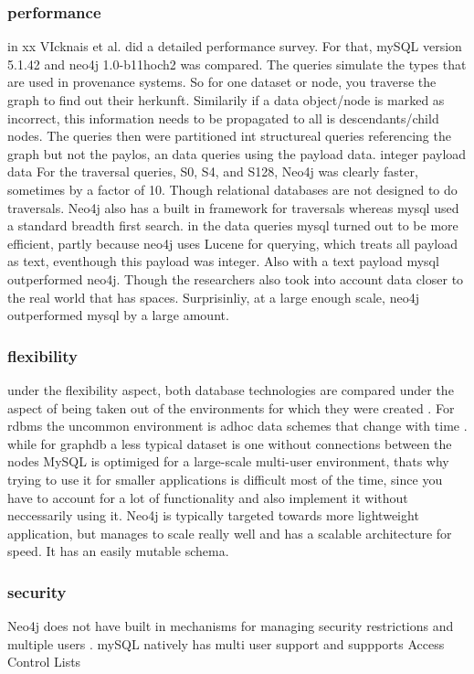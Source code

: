 \subsubsection{performance}
in xx VIcknais et al. did a detailed performance survey. For that, mySQL version 5.1.42 and neo4j 1.0-b11hoch2 was compared. \cite{Vicknair2010}
The queries simulate the types that are used in provenance systems. So for one dataset or node, you traverse the graph to find out their herkunft. Similarily if a data object/node is marked as incorrect, this information needs to be propagated to all is descendants/child nodes.
The queries then were partitioned int structureal queries referencing the graph but not the paylos, an data queries using the payload data. integer payload data
For the traversal queries, S0, S4, and S128, Neo4j was clearly faster, sometimes by a factor of 10. Though relational databases are not designed to do traversals. Neo4j also has a built in framework for traversals whereas mysql used a standard breadth first search.
in the data queries mysql turned out to be more efficient, partly because neo4j uses Lucene for querying, which treats all payload as text, eventhough this payload was integer. Also with a text payload mysql outperformed neo4j. Though the  researchers also took into account data closer to the real world that has spaces. Surprisinliy, at a large enough scale, neo4j outperformed mysql by a large amount.

\subsubsection{flexibility}
under the flexibility aspect, both database technologies are compared under the aspect of being taken out of the environments for which they were created \citep{Vicknair2010}. For rdbms the uncommon environment is adhoc data schemes that change with time \cite{GarimaAnalysis}. while for graphdb a less typical dataset is one without connections between the nodes
MySQL is optimiged for a large-scale multi-user environment, thats why trying to use it for smaller applications is difficult most of the time, since you have to account for a lot of functionality and also implement it without neccessarily using it. 
Neo4j is typically targeted towards more lightweight application, but manages to scale really well  and has a scalable architecture for speed. \cite{neo4jweb} It has an easily mutable schema.

\subsubsection{security}
Neo4j does not have built in mechanisms for managing security restrictions and multiple users \cite{GarimaAnalysis}.
mySQL natively has multi user support and suppports Access Control Lists

